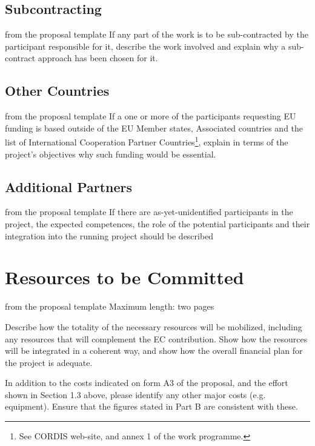 \subsection{Subcontracting}\label{sec:subcontracting}
\begin{todo}{from the proposal template}
  If any part of the work is to be sub-contracted by the participant responsible for it,
  describe the work involved and explain why a sub-contract approach has been chosen for
  it.
\end{todo}
\subsection{Other Countries}\label{sec:other-countries}
\begin{todo}{from the proposal template}
  If a one or more of the participants requesting EU funding is based outside of the EU
  Member states, Associated countries and the list of International Cooperation Partner
  Countries\footnote{See CORDIS web-site, and annex 1 of the work programme.}, explain in
  terms of the project’s objectives why such funding would be essential.
\end{todo}

\subsection{Additional Partners}\label{sec:assoc-partner}
\begin{todo}{from the proposal template}
  If there are as-yet-unidentified participants in the project, the expected competences,
  the role of the potential participants and their integration into the running project
  should be described
\end{todo}
\section{Resources to be Committed}\label{sec:resources}
\begin{todo}{from the proposal template}
Maximum length: two pages

Describe how the totality of the necessary resources will be mobilized, including any resources that
will complement the EC contribution. Show how the resources will be integrated in a coherent way,
and show how the overall financial plan for the project is adequate.

In addition to the costs indicated on form A3 of the proposal, and the effort shown in Section 1.3
above, please identify any other major costs (e.g. equipment). Ensure that the figures stated in Part B
are consistent with these.
\end{todo}

